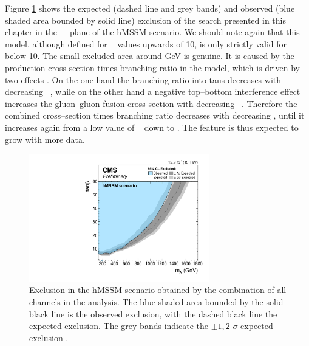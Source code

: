 Figure \ref{fig:mssm_hmssm_2016} shows the expected (dashed line and grey bands)
and observed (blue shaded area bounded by solid line) exclusion of the search
presented in this chapter in the \mA-\tanb~ plane of the hMSSM scenario. 
We should note again that this model, although defined for \tanb~ values
upwards of 10, is only strictly valid for \tanb~ below 10.
The small excluded area around  GeV is genuine. It is caused by the 
production cross-section times branching ratio in the model, which is driven by
two effects \cite{CMS-PAS-HIG-16-007}. On the one hand the branching ratio into taus decreases with decreasing
\tanb~, while on the other hand a negative top--bottom interference effect increases the
gluon--gluon fusion cross-section with decreasing \tanb~. Therefore the
combined cross--section times branching ratio decreases with decreasing \tanb, until it
increases again from a low value of \tanb~ down to . The feature is 
thus expected to grow with more data.

\begin{figure}[h!]
\begin{center}
\includegraphics[width=0.7\textwidth]{./MSSM/Figures/CMS-PAS-HIG-16-037_Figure_012-b.pdf}
\end{center}
\caption{Exclusion in the hMSSM scenario obtained by the combination
of all channels in the \AHtotautau analysis. The blue shaded area bounded by the 
solid black line is the observed exclusion, with the dashed black line the
expected exclusion. The grey bands indicate the $\pm 1,2$ $\sigma$ 
expected exclusion \cite{CMS-PAS-HIG-16-037}.}
\label{fig:mssm_hmssm_2016}
\end{figure}



